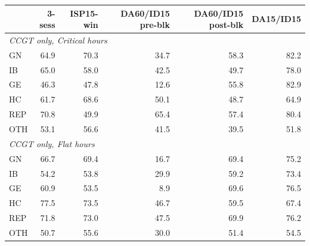 \begin{tabular}{l r r r r r}
\toprule
 & 3-sess & ISP15-win & DA60/ID15 pre-blk & DA60/ID15 post-blk & DA15/ID15 \\
\midrule
\multicolumn{6}{l}{\textit{CCGT only, Critical hours}} \\
GN & 64.9 & 70.3 & 34.7 & 58.3 & 82.2 \\
IB & 65.0 & 58.0 & 42.5 & 49.7 & 78.0 \\
GE & 46.3 & 47.8 & 12.6 & 55.8 & 82.9 \\
HC & 61.7 & 68.6 & 50.1 & 48.7 & 64.9 \\
REP & 70.8 & 49.9 & 65.4 & 57.4 & 80.4 \\
OTH & 53.1 & 56.6 & 41.5 & 39.5 & 51.8 \\
\midrule
\multicolumn{6}{l}{\textit{CCGT only, Flat hours}} \\
GN & 66.7 & 69.4 & 16.7 & 69.4 & 75.2 \\
IB & 54.2 & 53.8 & 29.9 & 59.2 & 73.4 \\
GE & 60.9 & 53.5 & 8.9 & 69.6 & 76.5 \\
HC & 77.5 & 73.5 & 46.7 & 59.5 & 67.4 \\
REP & 71.8 & 73.0 & 47.5 & 69.9 & 76.2 \\
OTH & 50.7 & 55.6 & 30.0 & 51.4 & 54.5 \\
\midrule
\bottomrule
\end{tabular}

